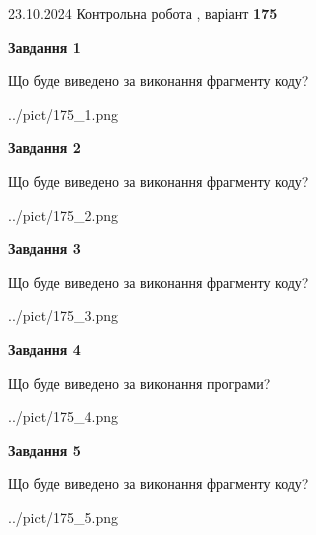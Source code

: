 \documentclass[12pt, ukrainian]{article}
\begin{document}
{\Large{23.10.2024 Контрольна робота , варіант  \No \textbf { 175 }\par}}
{
\begin {large}
{\begin {center}\textbf{Завдання 1}\end {center}}

Що буде виведено за виконання фрагменту коду?\par
\begin{center}
	{../pict/175_1.png}
\end{center}
\newpage

{\begin {center}\textbf{Завдання 2}\end {center}}

Що буде виведено за виконання фрагменту коду?\par
\begin{center}
	{../pict/175_2.png}
\end{center}
\newpage

{\begin {center}\textbf{Завдання 3}\end {center}}

Що буде виведено за виконання фрагменту коду?\par
\begin{center}
	{../pict/175_3.png}
\end{center}
\newpage

{\begin {center}\textbf{Завдання 4}\end {center}}

Що буде виведено за виконання програми?\par
\begin{center}
	{../pict/175_4.png}
\end{center}
\newpage

{\begin {center}\textbf{Завдання 5}\end {center}}

Що буде виведено за виконання фрагменту коду?\par
\begin{center}
	{../pict/175_5.png}
\end{center}
\newpage


\end{large}}
\end{document}
